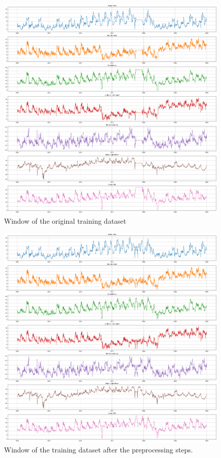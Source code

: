 \documentclass[conference]{IEEEtran}
\begin{document}
    
    \begin{figure}[h!]
        \includegraphics[width=\linewidth]{pre_processed_color.png}
        \caption{Window of the original training dataset}
        \label{fig:preprocessed_range}
    \end{figure}
    
    \begin{figure}[h!]
        \includegraphics[width=\linewidth]{post_processed_color.png}
        \caption{Window of the training dataset after the preprocessing steps.}
        \label{fig:postprocessed_range}
    \end{figure}
    
\end{document}

